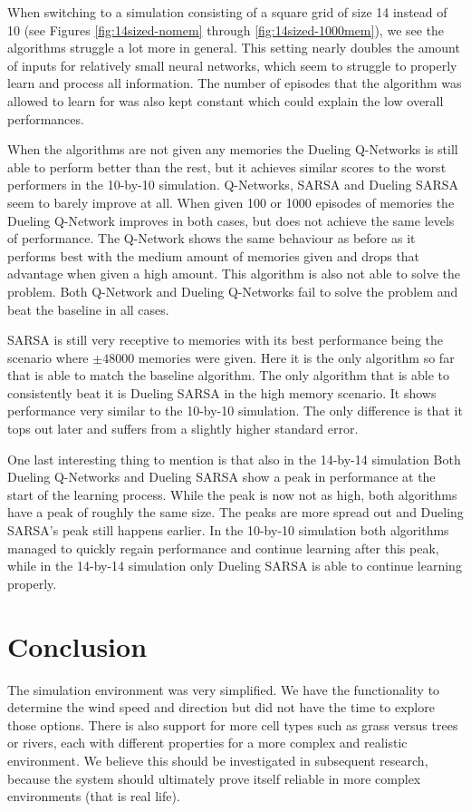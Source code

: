 When switching to a simulation consisting of a square grid of size 14 instead of 10 (see Figures \ref{fig:14sized-nomem} through \ref{fig:14sized-1000mem}), we see the algorithms struggle a lot more in general. This setting nearly doubles the amount of inputs for relatively small neural networks, which seem to struggle to properly learn and process all information. The number of episodes that the algorithm was allowed to learn for was also kept constant which could explain the low overall performances.

When the algorithms are not given any memories the Dueling Q-Networks is still able to perform better than the rest, but it achieves similar scores to the worst performers in the 10-by-10 simulation. Q-Networks, SARSA and Dueling SARSA seem to barely improve at all. When given 100 or 1000 episodes of memories the Dueling Q-Network improves in both cases, but does not achieve the same levels of performance. The Q-Network shows the same behaviour as before as it performs best with the medium amount of memories given and drops that advantage when given a high amount. This algorithm is also not able to solve the problem. Both Q-Network and Dueling Q-Networks fail to solve the problem and beat the baseline in all cases.

SARSA is still very receptive to memories with its best performance being the scenario where $\pm 48000$ memories were given. Here it is the only algorithm so far that is able to match the baseline algorithm. The only algorithm that is able to consistently beat it is Dueling SARSA in the high memory scenario. It shows performance very similar to the 10-by-10 simulation. The only difference is that it tops out later and suffers from a slightly higher standard error.

One last interesting thing to mention is that also in the 14-by-14 simulation Both Dueling Q-Networks and Dueling SARSA show a peak in performance at the start of the learning process. While the peak is now not as high, both algorithms have a peak of roughly the same size. The peaks are more spread out and Dueling SARSA's peak still happens earlier. In the 10-by-10 simulation both algorithms managed to quickly regain performance and continue learning after this peak, while in the 14-by-14 simulation only Dueling SARSA is able to continue learning properly.

\section{Conclusion}\label{sec:conclusions}
The simulation environment was very simplified. We have the functionality to determine the wind speed and direction but did not have the time to explore those options. There is also support for more cell types such as grass versus trees or rivers, each with different properties for a more complex and realistic environment. We believe this should be investigated in subsequent research, because the system should ultimately prove itself reliable in more complex environments (that is real life).

